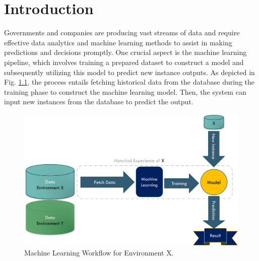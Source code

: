 
\chapter{Introduction}
\label{cha:1_Introduction}

\ifpdf
    \graphicspath{{1_introduction/figures/PNG/}{1_introduction/figures/PDF/}{1_introduction/figures/}}
\else
    \graphicspath{{1_introduction/figures/EPS/}{1_introduction/figures/}}
\fi



Governments and companies are producing vast streams of data and require effective data analytics and machine learning methods to assist in making predictions and decisions promptly. One crucial aspect is the machine learning pipeline, which involves training a prepared dataset to construct a model and subsequently utilizing this model to predict new instance outputs. As depicted in Fig. \ref{fig:machine-old-senario}, the process entails fetching historical data from the database during the training phase to construct the machine learning model. Then, the system can input new instances from the database to predict the output.

\begin{figure}[!ht]
    \centering
    \includegraphics[width=.9\textwidth]{1_introduction/figures/PNG/machine_flow.png}
    \caption{Machine Learning Workflow for Environment X.}
    \label{fig:machine-old-senario}
\end{figure}

